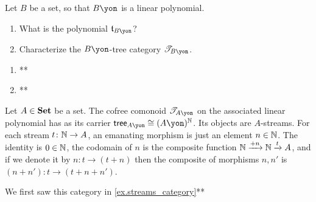 \documentclass[Book-Poly]{subfiles}
\begin{document}
\begin{exercise}
Let $B$ be a set, so that $B\yon$ is a linear polynomial.
\begin{enumerate}
	\item What is the polynomial $\ema{t}_{B\yon}$? 
	\item Characterize the $B\yon$-tree category $\cofree{B\yon}$.
\qedhere
\end{enumerate}
\begin{solution}
\begin{enumerate}
    \item **
    \item **
\end{enumerate}
\end{solution}
\end{exercise}


\begin{example}\label{ex.streams_cofree}
Let $A\in\mathbf{Set}$ be a set. The cofree comonoid $\cofree{A\yon}$ on the associated linear polynomial has as its carrier $\tr_{A\yon}\cong (A\yon)^\nn$. Its objects are $A$-streams. For each stream $t\colon \mathbb{N}\to A$, an emanating morphism is just an element $n\in\mathbb{N}$. The identity is $0\in\mathbb{N}$, the codomain of $n$ is the composite function $\mathbb{N}\xrightarrow{+n}\mathbb{N}\xrightarrow{t}A$, and if we denote it by $n\colon t\to (t+n)$ then the composite of morphisms $n,n'$ is $(n+n')\colon t\to (t+n+n')$.

We first saw this category in \cref{ex.streams_category}**
\end{example}
\end{document}
